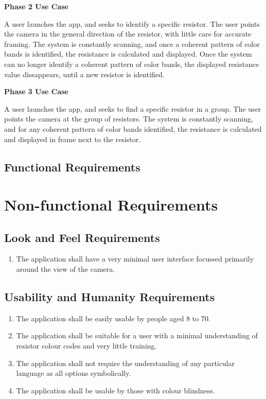 \documentclass{article}
\begin{document}
\textbf{ Phase 2 Use Case}

A user launches the app, and seeks to identify a specific resistor.
The user points the camera in the general direction of the resistor, with little care for accurate framing.
The system is constantly scanning, and once a coherent pattern of color bands is identified, the resistance is calculated and displayed.
Once the system can no longer identify a coherent pattern of color bands, the displayed resistance value dissappears, until a new resistor is identified.

\textbf{ Phase 3 Use Case}

A user launches the app, and seeks to find a specific resistor in a group.
The user points the camera at the group of resistors.
The system is constantly scanning, and for any coherent pattern of color bands identified, the resistance is calculated and displayed in frame next to the resistor.

\subsection{Functional Requirements}


\section{Non-functional Requirements}

\subsection{Look and Feel Requirements }
\begin{enumerate}
\item The application shall have a very minimal user interface focussed primarily around the view of the camera.
\end{enumerate}
\subsection{Usability and Humanity Requirements}
\begin{enumerate}
\item The application shall be easily usable by people aged 8 to 70.
\item The application shall be suitable for a user with a minimal understanding of resistor colour codes and very little training.
\item The application shall not require the understanding of any particular language as all options symbolically.
\item The application shall be usable by those with colour blindness.
\end{enumerate}
\end{document}

